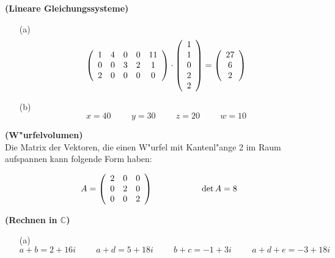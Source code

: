 \documentclass[11pt,a4paper,leqno]{article}
\begin{document}
\begin{Gruppenuebungen}
\Aufgabe %
\textbf{(Lineare Gleichungssysteme)}
\begin{itemize}
\item[(a)]
\[
\left( {\begin{array}{*{20}c}
   1 & 4 & 0 & 0 & {11}  \\
   0 & 0 & 3 & 2 & 1  \\
   2 & 0 & 0 & 0 & 0  \\
\end{array}} \right) \cdot \left( {\begin{array}{*{20}c}
   1  \\
   1  \\
   0  \\
   2  \\
   2  \\
\end{array}} \right) = \left( {\begin{array}{*{20}c}
   {27}  \\
   6  \\
   2  \\
\end{array}} \right)
\]

\item[(b)]
$$
x=40 \hspace{1cm} y=30 \hspace{1cm} z=20 \hspace{1cm} w=10 
$$

\end{itemize}

\Aufgabe %
\textbf{(W"urfelvolumen)}\\

Die Matrix der Vektoren, die einen W"urfel mit Kantenl"ange 2 im Raum aufspannen kann folgende Form haben:

\[
A = \left( {\begin{array}{*{20}c}
   2 & 0 & 0  \\
   0 & 2 & 0  \\
   0 & 0 & 2  \\
\end{array}} \right) \hspace{2cm}
\det A = 8
\]

\pagebreak

\Aufgabe %
\textbf{(Rechnen in $\mathbb{C}$)}
\begin{itemize}
\item[(a)]
$$
a+b=2+16i \hspace{1cm} a+d=5+18i \hspace{1cm} b+c=-1+3i \hspace{1cm} a+d+e=-3+18i
$$


\end{itemize}
\end{Gruppenuebungen}
\end{document}
